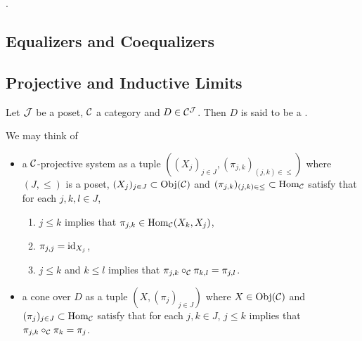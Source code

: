 \documentclass{book}
\begin{document}
	\begin{ex}
		. 
	\end{ex}
	
	
	
	
	
	
	
	
	
	
	\subsection{Equalizers and Coequalizers}
	
	
	
	
	
	
	
	
	
	
	
	
	
	
	
	
	
	\subsection{Projective and Inductive Limits}
	
	\begin{defn}
		Let $\mathcal{J}$ be a  poset, $\mathcal{C}$ a category and $D \in \mathcal{C}^{\mathcal{J}}$. Then $D$ is said to be a .  
	\end{defn}

	\begin{note}
		We may think of 
		\begin{itemize}
			\item a $\mathcal{C}$-projective system as a tuple $((X_j)_{j \in J}, (\pi_{j,k})_{(j,k) \in \leq})$ where $(J, \leq)$ is a  poset, $(X_j)_{j \in J} \subset \operatorname{Obj}(\mathcal{C})$ and $(\pi_{j,k})_{(j,k) \in \leq} \subset \operatorname{Hom}_{\mathcal{C}}$ satisfy that for each $j,k,l \in J$, 
			\begin{enumerate}
				\item $j \leq k$ implies that $\pi_{j,k} \in \operatorname{Hom}_{\mathcal{C}}(X_k, X_j)$,
				\item $\pi_{j,j} = \operatorname{id}_{X_j}$,
				\item $j \leq k$ and $k \leq l$ implies that $\pi_{j,k} \circ_{\mathcal{C}} \pi_{k,l} = \pi_{j,l}$.
			\end{enumerate}
			\item a cone over $D$ as a tuple $(X, (\pi_j)_{j \in J})$ where $X \in \operatorname{Obj}(\mathcal{C})$ and $(\pi_j)_{j \in J} \subset \operatorname{Hom}_{\mathcal{C}}$ satisfy that for each $j,k \in J$, $j \leq k$ implies that $\pi_{j,k} \circ_{\mathcal{C}} \pi_k = \pi_j$. 
		\end{itemize}
	\end{note}
	
\end{document}
